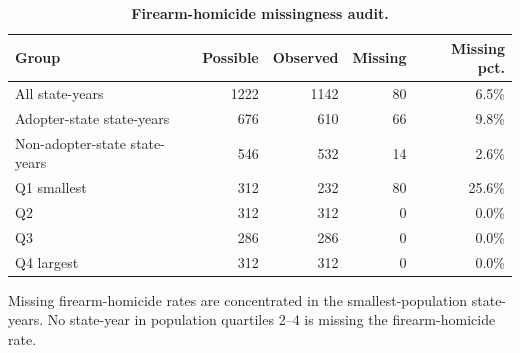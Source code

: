 \begin{table}[H]
\centering
\caption{\textbf{Firearm-homicide missingness audit.}}
\label{tab:homicide_missingness}
\begin{threeparttable}
\begin{tabular}{lrrrr}
\toprule
Group & Possible & Observed & Missing & Missing pct. \\
\midrule
All state-years & 1222 & 1142 & 80 & 6.5\% \\
Adopter-state state-years & 676 & 610 & 66 & 9.8\% \\
Non-adopter-state state-years & 546 & 532 & 14 & 2.6\% \\
Q1 smallest & 312 & 232 & 80 & 25.6\% \\
Q2 & 312 & 312 & 0 & 0.0\% \\
Q3 & 286 & 286 & 0 & 0.0\% \\
Q4 largest & 312 & 312 & 0 & 0.0\% \\
\bottomrule
\end{tabular}
\begin{tablenotes}
\small
\item Missing firearm-homicide rates are concentrated in the smallest-population state-years. No state-year in population quartiles 2--4 is missing the firearm-homicide rate.
\end{tablenotes}
\end{threeparttable}
\end{table}
